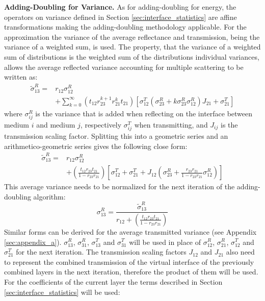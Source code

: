 \textbf{Adding-Doubling for Variance.} As for adding-doubling for energy, the operators on variance defined in Section \ref{sec:interface_statistics} are affine transformations making the adding-doubling methodology applicable. For the approximation the variance of the average reflectance and transmission, being the variance of a weighted sum, is used. The property, that the variance of a weighted sum of distributions is the weighted sum of the distributions individual variances, allows the average reflected variance accounting for multiple scattering to be written as:
\begin{equation}
    \begin{aligned}
        \tilde{\sigma}_{13}^R = &r_{12} \sigma_{12}^R \\
        &+ \sum_{k=0}^{\infty} \left(t_{12} r_{23}^{k+1}r_{21}^k t_{21}\right) \left[\sigma_{12}^T \left(\sigma_{23}^R + k \sigma_{23}^R \sigma_{12}^R\right) J_{21} + \sigma_{21}^T\right]
    \end{aligned}
\end{equation}
where $\sigma_{ij}^R$ is the variance that is added when reflecting on the interface between medium $i$ and medium $j$, respectively $\sigma_{ij}^T$ when transmitting, and $J_{ij}$ is the transmission scaling factor. Splitting this into a geometric series and an arithmetico-geometric series gives the following close form:
\begin{equation}
    \begin{aligned}
        \tilde{\sigma}_{13}^R = &r_{12} \sigma_{12}^R \\
        &+ \left(\frac{t_{12} r_{23} t_{21}}{1 - r_{23} r_{21}}\right) \left[\sigma_{12}^T + \sigma_{21}^T + J_{12} \left(\sigma_{23}^R + \frac{r_{23} r_{21}}{1 - r_{23} r_{21}}\sigma_{12}^R\right)\right]
    \end{aligned}
\end{equation} 
This average variance needs to be normalized for the next iteration of the adding-doubling algorithm:
\begin{equation}
    \sigma_{13}^R = \frac{\tilde{\sigma}_{13}^R}{r_{12}+\left(\frac{t_{12} r_{23} t_{21}}{1 - r_{23} r_{21}}\right)}
\end{equation}
Similar forms can be derived for the average transmitted variance (see Appendix \ref{sec:appendix_a}). $\sigma_{13}^R$, $\sigma_{31}^R$, $\sigma_{13}^T$ and $\sigma_{31}^T$ will be used in place of $\sigma_{12}^R$, $\sigma_{21}^R$, $\sigma_{12}^T$ and $\sigma_{21}^T$ for the next iteration. The transmission scaling factors $J_{12}$ and $J_{21}$ also need to represent the combined transmission of the virtual interface of the previously combined layers in the next iteration, therefore the product of them will be used. For the coefficients of the current layer the terms described in Section \ref{sec:interface_statistics} will be used:
